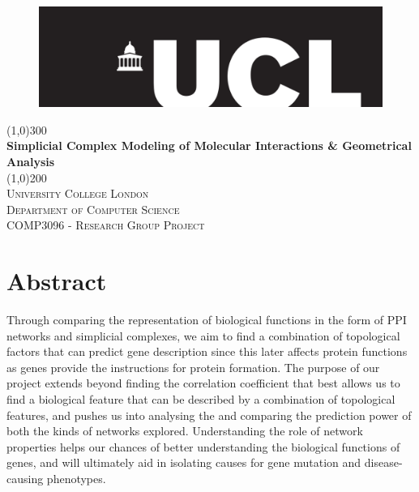 \documentclass[9pt]{article}
\begin{document}
\begin{titlepage}
\begin{center}
\begin{figure}[t]
\hspace*{0.35cm}\includegraphics[width=1.0\textwidth]{uclLogo}\\
\end{figure}
\line(1,0){300}\\
[0.25in]
\huge{\bfseries Simplicial Complex Modeling of Molecular Interactions \& Geometrical Analysis}\\
[2mm]
\line(1,0){200}\\
[1.5cm]
\textsc{\LARGE University College London}\\
\textsc{\normalsize Department of Computer Science}\\
\textsc{\normalsize COMP3096 - Research Group Project}\\
[5cm]
\end{center}

\end{titlepage}

\newpage
\section{Abstract}\label{sec:abstract}
Through comparing the representation of biological functions in the form of PPI networks and simplicial complexes, we aim to find a combination of topological factors that can predict gene description since this later affects protein functions as genes provide the instructions for protein formation. The purpose of our project extends beyond finding the correlation coefficient that best allows us to find a biological feature that can be described by a combination of topological features, and pushes us into analysing the and comparing the prediction power of both the kinds of networks explored. Understanding the role of network properties helps our chances of better understanding the biological functions of genes, and will ultimately aid in isolating causes for gene mutation and disease-causing phenotypes.
\end{document}
